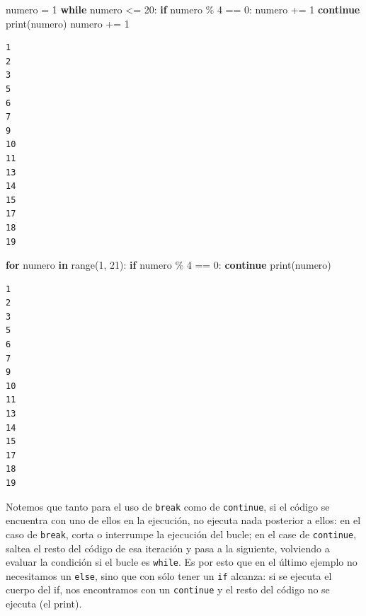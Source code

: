 \documentclass[
  letterpaper,
  DIV=11,
  numbers=noendperiod]{scrreprt}
\newenvironment{Shaded}{\begin{snugshade}}{\end{snugshade}}
\newcommand{\BuiltInTok}[1]{\textcolor[rgb]{0.00,0.23,0.31}{#1}}
\newcommand{\ControlFlowTok}[1]{\textcolor[rgb]{0.00,0.23,0.31}{\textbf{#1}}}
\newcommand{\DecValTok}[1]{\textcolor[rgb]{0.68,0.00,0.00}{#1}}
\newcommand{\KeywordTok}[1]{\textcolor[rgb]{0.00,0.23,0.31}{\textbf{#1}}}
\newcommand{\NormalTok}[1]{\textcolor[rgb]{0.00,0.23,0.31}{#1}}
\newcommand{\OperatorTok}[1]{\textcolor[rgb]{0.37,0.37,0.37}{#1}}
\begin{document}
\begin{Shaded}
\begin{Highlighting}[]
\NormalTok{numero }\OperatorTok{=} \DecValTok{1}
\ControlFlowTok{while}\NormalTok{ numero }\OperatorTok{\textless{}=} \DecValTok{20}\NormalTok{:}
  \ControlFlowTok{if}\NormalTok{ numero }\OperatorTok{\%} \DecValTok{4} \OperatorTok{==} \DecValTok{0}\NormalTok{:}
\NormalTok{      numero }\OperatorTok{+=} \DecValTok{1}
      \ControlFlowTok{continue}
  \BuiltInTok{print}\NormalTok{(numero)}
\NormalTok{  numero }\OperatorTok{+=} \DecValTok{1}
\end{Highlighting}
\end{Shaded}

\begin{verbatim}
1
2
3
5
6
7
9
10
11
13
14
15
17
18
19
\end{verbatim}

\begin{Shaded}
\begin{Highlighting}[]
\ControlFlowTok{for}\NormalTok{ numero }\KeywordTok{in} \BuiltInTok{range}\NormalTok{(}\DecValTok{1}\NormalTok{, }\DecValTok{21}\NormalTok{):}
  \ControlFlowTok{if}\NormalTok{ numero }\OperatorTok{\%} \DecValTok{4} \OperatorTok{==} \DecValTok{0}\NormalTok{:}
      \ControlFlowTok{continue}
  \BuiltInTok{print}\NormalTok{(numero)}
\end{Highlighting}
\end{Shaded}

\begin{verbatim}
1
2
3
5
6
7
9
10
11
13
14
15
17
18
19
\end{verbatim}

\begin{tcolorbox}[enhanced jigsaw, opacitybacktitle=0.6, toptitle=1mm, toprule=.15mm, arc=.35mm, breakable, bottomrule=.15mm, opacityback=0, leftrule=.75mm, rightrule=.15mm, title=\textcolor{quarto-callout-note-color}{\faInfo}\hspace{0.5em}{Note}, left=2mm, bottomtitle=1mm, colframe=quarto-callout-note-color-frame, colback=white, titlerule=0mm, coltitle=black, colbacktitle=quarto-callout-note-color!10!white]

Notemos que tanto para el uso de \texttt{break} como de
\texttt{continue}, si el código se encuentra con uno de ellos en la
ejecución, no ejecuta nada posterior a ellos: en el caso de
\texttt{break}, corta o interrumpe la ejecución del bucle; en el case de
\texttt{continue}, saltea el resto del código de esa iteración y pasa a
la siguiente, volviendo a evaluar la condición si el bucle es
\texttt{while}. Es por esto que en el último ejemplo no necesitamos un
\texttt{else}, sino que con sólo tener un \texttt{if} alcanza: si se
ejecuta el cuerpo del if, nos encontramos con un \texttt{continue} y el
resto del código no se ejecuta (el print).

\end{tcolorbox}
\end{document}
